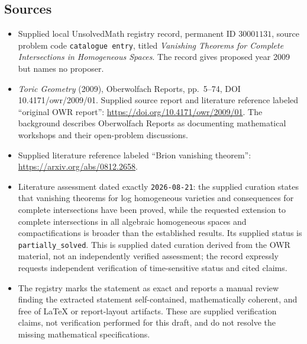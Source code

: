 \documentclass[11pt]{article}
\begin{document}
\subsection{Sources}
\begin{itemize}
\item Supplied local UnsolvedMath registry record, permanent ID \(30001131\), source problem code \texttt{catalogue entry}, titled \emph{Vanishing Theorems for Complete Intersections in Homogeneous Spaces}. The record gives proposed year 2009 but names no proposer.
\item \emph{Toric Geometry} (2009), Oberwolfach Reports, pp.\ 5--74, DOI 10.4171/owr/2009/01. Supplied source report and literature reference labeled ``original OWR report'': \url{https://doi.org/10.4171/owr/2009/01}. The background describes Oberwolfach Reports as documenting mathematical workshops and their open-problem discussions.
\item Supplied literature reference labeled ``Brion vanishing theorem'': \url{https://arxiv.org/abs/0812.2658}.
\item Literature assessment dated exactly \texttt{2026-08-21}: the supplied curation states that vanishing theorems for log homogeneous varieties and consequences for complete intersections have been proved, while the requested extension to complete intersections in all algebraic homogeneous spaces and compactifications is broader than the established results. Its supplied status is \texttt{partially\_solved}. This is supplied dated curation derived from the OWR material, not an independently verified assessment; the record expressly requests independent verification of time-sensitive status and cited claims.
\item The registry marks the statement as exact and reports a manual review finding the extracted statement self-contained, mathematically coherent, and free of LaTeX or report-layout artifacts. These are supplied verification claims, not verification performed for this draft, and do not resolve the missing mathematical specifications.
\end{itemize}
\end{document}
